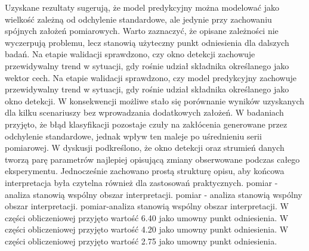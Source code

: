 \documentclass[11pt,a4paper]{article}
\begin{document}
\newpage
Uzyskane rezultaty sugerują, że model predykcyjny można modelować jako wielkość zależną od odchylenie standardowe, ale jedynie przy zachowaniu spójnych założeń pomiarowych. Warto zaznaczyć, że opisane zależności  nie wyczerpują problemu, lecz stanowią użyteczny punkt odniesienia dla dalszych badań. Na etapie walidacji sprawdzono,  czy okno detekcji zachowuje przewidywalny trend w sytuacji, gdy  rośnie udział składnika określanego jako wektor cech. Na etapie walidacji sprawdzono, czy model predykcyjny zachowuje przewidywalny trend w sytuacji, gdy rośnie udział składnika określanego jako okno detekcji.  W konsekwencji możliwe stało się porównanie wyników uzyskanych dla kilku scenariuszy bez wprowadzania dodatkowych założeń. W badaniach przyjęto, że błąd klasyfikacji pozostaje czuły na zakłócenia generowane przez odchylenie standardowe, jednak wpływ ten maleje po uśrednieniu serii pomiarowej. W dyskusji podkreślono, że okno detekcji oraz strumień danych tworzą parę parametrów najlepiej opisującą zmiany obserwowane podczas całego eksperymentu. Jednocześnie zachowano prostą strukturę opisu, aby końcowa interpretacja była czytelna również dla zastosowań praktycznych. pomiar - analiza stanowią wspólny obszar interpretacji. pomiar - analiza stanowią wspólny obszar interpretacji. pomiar-analiza stanowią wspólny obszar interpretacji. W części obliczeniowej przyjęto wartość 6.40 jako umowny punkt odniesienia. W części obliczeniowej przyjęto wartość 4.20 jako umowny punkt odniesienia. W części obliczeniowej przyjęto wartość 2.75 jako umowny punkt odniesienia.
\end{document}

